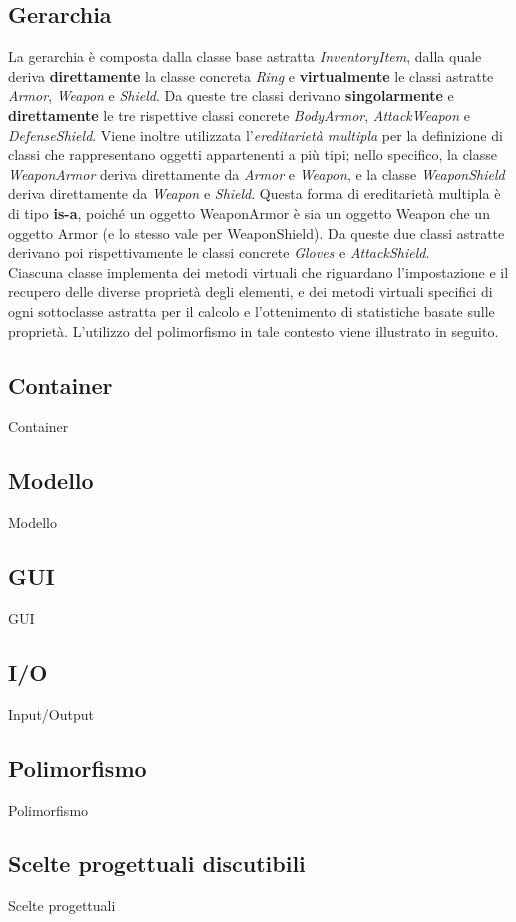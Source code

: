 \subsection{Gerarchia}
La gerarchia è composta dalla classe base astratta \textit{InventoryItem}, dalla quale deriva \textbf{direttamente} la classe concreta \textit{Ring} e \textbf{virtualmente} le classi astratte \textit{Armor}, \textit{Weapon} e \textit{Shield}. Da queste tre classi derivano \textbf{singolarmente} e \textbf{direttamente} le tre rispettive classi concrete \textit{BodyArmor}, \textit{AttackWeapon} e \textit{DefenseShield}. Viene inoltre utilizzata l'\textit{ereditarietà multipla} per la definizione di classi che rappresentano oggetti appartenenti a più tipi; nello specifico, la classe \textit{WeaponArmor} deriva direttamente da \textit{Armor} e \textit{Weapon}, e la classe \textit{WeaponShield} deriva direttamente da \textit{Weapon} e \textit{Shield}. Questa forma di ereditarietà multipla è di tipo \textbf{is-a}, poiché un oggetto WeaponArmor è sia un oggetto Weapon che un oggetto Armor (e lo stesso vale per WeaponShield). Da queste due classi astratte derivano poi rispettivamente le classi concrete \textit{Gloves} e \textit{AttackShield}. \\
Ciascuna classe implementa dei metodi virtuali che riguardano l'impostazione e il recupero delle diverse proprietà degli elementi, e dei metodi virtuali specifici di ogni sottoclasse astratta per il calcolo e l'ottenimento di statistiche basate sulle proprietà. L'utilizzo del polimorfismo in tale contesto viene illustrato in seguito.

\subsection{Container}
Container

\subsection{Modello}
Modello

\subsection{GUI}
GUI

\subsection{I/O}
Input/Output

\subsection{Polimorfismo}
Polimorfismo

\subsection{Scelte progettuali discutibili}
Scelte progettuali
